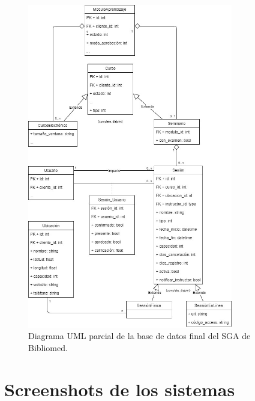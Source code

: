 \begin{figure}[h]
	\begin{center}
		\includegraphics[width=0.8\textwidth]{figuras/databaseBibliomed.jpg}
		\caption{Diagrama UML parcial de la base de datos final del SGA de Bibliomed.} \label{fig:baseDeDatosBibliomed}
	\end{center}
\end{figure}


\chapter{Screenshots de los sistemas}


